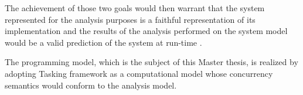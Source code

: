 The achievement of those two goals would then warrant that the system represented for the analysis purposes is a faithful representation of its implementation and the results of the analysis performed on the system model would be a valid prediction of the system at run-time \cite{PhdThesis}.

The programming model, which is the subject of this Master thesis, is realized by adopting Tasking framework as a computational model whose concurrency semantics would conform to the analysis model.     
